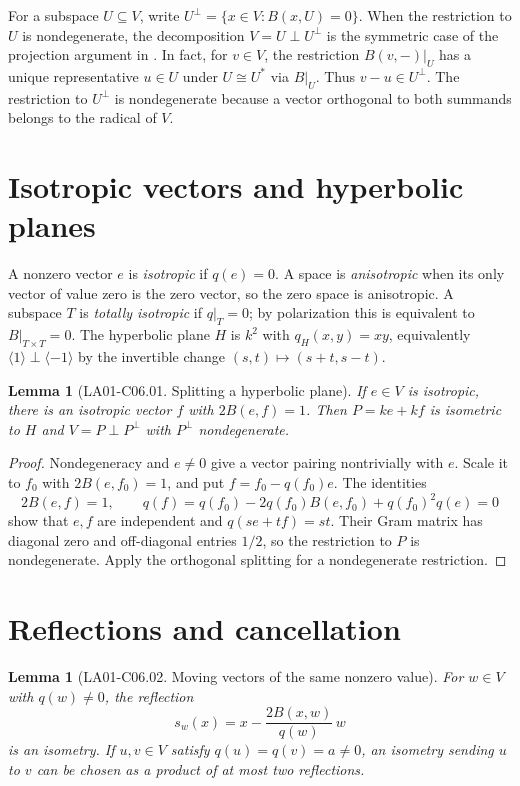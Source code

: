 \documentclass[11pt,oneside,openany]{book}
\newtheorem{lemma}[theorem]{Lemma}
\theoremstyle{definition}
\theoremstyle{remark}
\begin{document}
For a subspace \(U\subseteq V\), write
\(U^\perp=\{x\in V:B(x,U)=0\}\).
When the restriction to \(U\) is nondegenerate, the decomposition
\(V=U\perp U^\perp\) is the symmetric case of the projection argument
in \cite[11.nondegenerate]{d05}. In fact, for \(v\in V\), the
restriction \(B(v,-)|_U\) has a unique representative \(u\in U\)
under \(U\cong U^*\) via \(B|_U\). Thus \(v-u\in U^\perp\).
The restriction to \(U^\perp\) is nondegenerate because a vector
orthogonal to both summands belongs to the radical of \(V\).

\section{Isotropic vectors and hyperbolic planes}

A nonzero vector \(e\) is \emph{isotropic} if \(q(e)=0\).
A space is \emph{anisotropic} when its only vector of value zero is
the zero vector, so the zero space is anisotropic. A subspace \(T\)
is \emph{totally isotropic} if \(q|_T=0\); by polarization this is
equivalent to \(B|_{T\times T}=0\). The hyperbolic plane \(H\) is
\(k^2\) with \(q_H(x,y)=xy\), equivalently
\(\langle 1\rangle\perp\langle -1\rangle\) by the invertible
change \((s,t)\mapsto(s+t,s-t)\).

\begin{lemma}[LA01-C06.01. Splitting a hyperbolic plane]
\label{lem:la01-hyperbolic-splitting}
If \(e\in V\) is isotropic, there is an isotropic vector \(f\)
with \(2B(e,f)=1\). Then \(P=ke+kf\) is isometric to \(H\) and
\(V=P\perp P^\perp\) with \(P^\perp\) nondegenerate.
\end{lemma}

\begin{proof}
Nondegeneracy and \(e\ne 0\) give a vector pairing nontrivially
with \(e\). Scale it to \(f_0\) with \(2B(e,f_0)=1\), and put
\(f=f_0-q(f_0)e\). The identities
\[
  2B(e,f)=1,\qquad
  q(f)=q(f_0)-2q(f_0)B(e,f_0)+q(f_0)^2q(e)=0
\]
show that \(e,f\) are independent and \(q(se+tf)=st\).
Their Gram matrix has diagonal zero and off-diagonal entries
\(1/2\), so the restriction to \(P\) is nondegenerate. Apply the
orthogonal splitting for a nondegenerate restriction.
\end{proof}

\section{Reflections and cancellation}

\begin{lemma}[LA01-C06.02. Moving vectors of the same nonzero value]
\label{lem:la01-reflections}
For \(w\in V\) with \(q(w)\ne 0\), the reflection
\[
  s_w(x)=x-\frac{2B(x,w)}{q(w)}\,w
\]
is an isometry. If \(u,v\in V\) satisfy
\(q(u)=q(v)=a\ne 0\), an isometry sending \(u\) to \(v\)
can be chosen as a product of at most two reflections.
\end{lemma}
\end{document}
